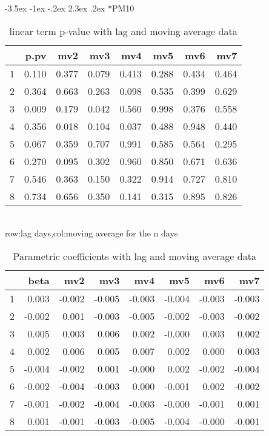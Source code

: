 \documentclass[a4paper, 12pt]{article}
\makeatletter
\def\large{\fontsize{14}{20}\selectfont}
\renewcommand\subsection{\@startsection {subsection}{1}{\z@}%
                                   {-3.5ex \@plus -1ex \@minus -.2ex}%
                                   {2.3ex \@plus.2ex}%
                                   {\centering\normalfont\large\bfseries}}
\makeatother
\begin{document}
\subsection*{PM10}
\begin{table}[h]
\centering
\caption{linear term p-value with lag and moving average data}
\begin{tabular}{rrrrrrrr}
  \hline
 & p.pv & mv2 & mv3 & mv4 & mv5 & mv6 & mv7 \\
  \hline
1 & 0.110 & 0.377 & 0.079 & 0.413 & 0.288 & 0.434 & 0.464 \\
  2 & 0.364 & 0.663 & 0.263 & 0.098 & 0.535 & 0.399 & 0.629 \\
  3 & 0.009 & 0.179 & 0.042 & 0.560 & 0.998 & 0.376 & 0.558 \\
  4 & 0.356 & 0.018 & 0.104 & 0.037 & 0.488 & 0.948 & 0.440 \\
  5 & 0.067 & 0.359 & 0.707 & 0.991 & 0.585 & 0.564 & 0.295 \\
  6 & 0.270 & 0.095 & 0.302 & 0.960 & 0.850 & 0.671 & 0.636 \\
  7 & 0.546 & 0.363 & 0.150 & 0.322 & 0.914 & 0.727 & 0.810 \\
  8 & 0.734 & 0.656 & 0.350 & 0.141 & 0.315 & 0.895 & 0.826 \\
   \hline
\end{tabular}
\\row:lag days,col:moving average for the n days
\end{table}

\begin{table}[h]
\centering
\caption{Parametric coefficients with lag and moving average data}
\begin{tabular}{rrrrrrrr}
  \hline
 & beta & mv2 & mv3 & mv4 & mv5 & mv6 & mv7 \\
  \hline
1 & 0.003 & -0.002 & -0.005 & -0.003 & -0.004 & -0.003 & -0.003 \\
  2 & -0.002 & 0.001 & -0.003 & -0.005 & -0.002 & -0.003 & -0.002 \\
  3 & 0.005 & 0.003 & 0.006 & 0.002 & -0.000 & 0.003 & 0.002 \\
  4 & 0.002 & 0.006 & 0.005 & 0.007 & 0.002 & 0.000 & 0.003 \\
  5 & -0.004 & -0.002 & 0.001 & -0.000 & 0.002 & -0.002 & -0.004 \\
  6 & -0.002 & -0.004 & -0.003 & 0.000 & -0.001 & 0.002 & -0.002 \\
  7 & -0.001 & -0.002 & -0.004 & -0.003 & -0.000 & -0.001 & 0.001 \\
  8 & 0.001 & -0.001 & -0.003 & -0.005 & -0.004 & -0.000 & -0.001 \\
   \hline
\end{tabular}
\end{table}
\clearpage
\end{document}

